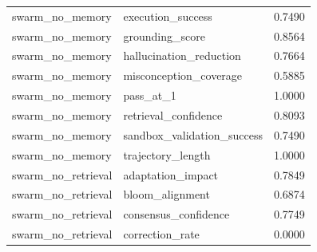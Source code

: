 \begin{tabular}{llr}
swarm_no_memory & execution\_success & 0.7490 \\
swarm_no_memory & grounding\_score & 0.8564 \\
swarm_no_memory & hallucination\_reduction & 0.7664 \\
swarm_no_memory & misconception\_coverage & 0.5885 \\
swarm_no_memory & pass\_at\_1 & 1.0000 \\
swarm_no_memory & retrieval\_confidence & 0.8093 \\
swarm_no_memory & sandbox\_validation\_success & 0.7490 \\
swarm_no_memory & trajectory\_length & 1.0000 \\
swarm_no_retrieval & adaptation\_impact & 0.7849 \\
swarm_no_retrieval & bloom\_alignment & 0.6874 \\
swarm_no_retrieval & consensus\_confidence & 0.7749 \\
swarm_no_retrieval & correction\_rate & 0.0000 \\
\bottomrule
\end{tabular}

